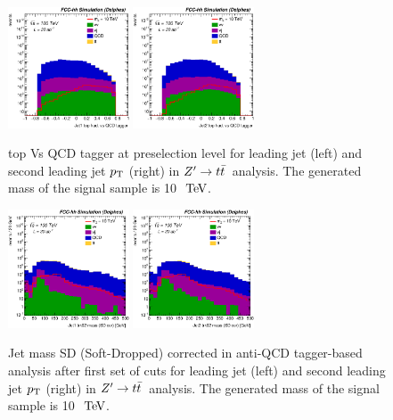 \documentclass{cernrep}
\newcommand*{\zptt}{\ensuremath{Z^{\prime} \rightarrow \ttbar}}
\begin{document}
\begin{figure}[!htb]\centering
\includegraphics[width=0.32\textwidth]{Fig/Zptt/Jet1_thad_vs_QCD_tagger_sel0_nostack_log.eps}
\includegraphics[width=0.32\textwidth]{Fig/Zptt/Jet2_thad_vs_QCD_tagger_sel0_nostack_log.eps}
\caption{top Vs QCD tagger at preselection level for leading jet (left) and second leading jet $p\sb{\scriptstyle\mathrm{T}}$ (right) in \zptt\ analysis. The generated mass of the signal sample is 10 $\TeV$.}
\label{fig:Zptt_sel0_tagger}
\end{figure}

\begin{figure}[!htb]\centering
\includegraphics[width=0.32\textwidth]{Fig/Zptt/Jet1_trk02_SD_Cor_m_sel3_nostack_log.eps}
\includegraphics[width=0.32\textwidth]{Fig/Zptt/Jet2_trk02_SD_Cor_m_sel3_nostack_log.eps}
\caption{Jet mass SD (Soft-Dropped) corrected in anti-QCD tagger-based analysis after first set of cuts for leading jet (left) and second leading jet $p\sb{\scriptstyle\mathrm{T}}$ (right) in \zptt\ analysis. The generated mass of the signal sample is 10 $\TeV$.}
\label{fig:Zptt_sel1_tagger}
\end{figure}
\end{document}
